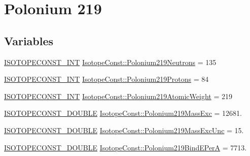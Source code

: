 \hypertarget{group___isotope_const-_polonium-_po219}{}\section{Polonium 219}
\label{group___isotope_const-_polonium-_po219}
\subsection*{Variables}
\begin{DoxyCompactItemize}
\item 
\mbox{\hyperlink{group___isotope_const-_macros_ga5f18360b3e99483a35c32d789e62621c}{I\+S\+O\+T\+O\+P\+E\+C\+O\+N\+S\+T\+\_\+\+I\+NT}} \mbox{\hyperlink{group___isotope_const-_polonium-_po219_gaa10251789011e968f87fc8346edd14a5}{Isotope\+Const\+::\+Polonium219\+Neutrons}} = 135
\item 
\mbox{\hyperlink{group___isotope_const-_macros_ga5f18360b3e99483a35c32d789e62621c}{I\+S\+O\+T\+O\+P\+E\+C\+O\+N\+S\+T\+\_\+\+I\+NT}} \mbox{\hyperlink{group___isotope_const-_polonium-_po219_gaaac3c653782a7eb4536d9225cee516c1}{Isotope\+Const\+::\+Polonium219\+Protons}} = 84
\item 
\mbox{\hyperlink{group___isotope_const-_macros_ga5f18360b3e99483a35c32d789e62621c}{I\+S\+O\+T\+O\+P\+E\+C\+O\+N\+S\+T\+\_\+\+I\+NT}} \mbox{\hyperlink{group___isotope_const-_polonium-_po219_ga0c91313d76089c07ff08db2c7899dc25}{Isotope\+Const\+::\+Polonium219\+Atomic\+Weight}} = 219
\item 
\mbox{\hyperlink{group___isotope_const-_macros_ga8f45a7272ce02c0b4c65c44636ed719a}{I\+S\+O\+T\+O\+P\+E\+C\+O\+N\+S\+T\+\_\+\+D\+O\+U\+B\+LE}} \mbox{\hyperlink{group___isotope_const-_polonium-_po219_ga013fc8799809c2ba5270cdccb1bc1215}{Isotope\+Const\+::\+Polonium219\+Mass\+Exc}} = 12681.
\item 
\mbox{\hyperlink{group___isotope_const-_macros_ga8f45a7272ce02c0b4c65c44636ed719a}{I\+S\+O\+T\+O\+P\+E\+C\+O\+N\+S\+T\+\_\+\+D\+O\+U\+B\+LE}} \mbox{\hyperlink{group___isotope_const-_polonium-_po219_ga3f895a2d4b8686431db256e1c6288578}{Isotope\+Const\+::\+Polonium219\+Mass\+Exc\+Unc}} = 15.
\item 
\mbox{\hyperlink{group___isotope_const-_macros_ga8f45a7272ce02c0b4c65c44636ed719a}{I\+S\+O\+T\+O\+P\+E\+C\+O\+N\+S\+T\+\_\+\+D\+O\+U\+B\+LE}} \mbox{\hyperlink{group___isotope_const-_polonium-_po219_gae92f503a0a0a25bfbd9789a785484bcc}{Isotope\+Const\+::\+Polonium219\+Bind\+E\+PerA}} = 7713.
\item 

\end{DoxyCompactItemize}
